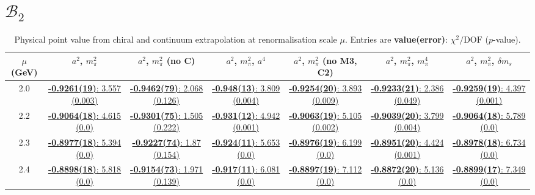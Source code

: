 \documentclass[12pt]{extarticle}
\begin{document}
\section{$\mathcal{B}_2$}
\begin{table}[h!]
\begin{center}
\begin{tabular}{|c|c|c|c|c|c|c|}
\hline
$\mu$ (GeV) & $a^2$, $m_\pi^2$& $a^2$, $m_\pi^2$ (no C)& $a^2$, $m_\pi^2$, $a^4$& $a^2$, $m_\pi^2$ (no M3, C2)& $a^2$, $m_\pi^2$, $m_\pi^4$& $a^2$, $m_\pi^2$, $\delta m_s$\\
\hline
2.0& \hyperlink{VVmAA/SUSY/bag_a2m2_20.pdf.1}{\textbf{-0.9261(19)}: 3.557 (0.003)} & \hyperlink{VVmAA/SUSY/bag_a2m2noC_20.pdf.1}{\textbf{-0.9462(79)}: 2.068 (0.126)} & \hyperlink{VVmAA/SUSY/bag_a2a4m2_20.pdf.1}{\textbf{-0.948(13)}: 3.809 (0.004)} & \hyperlink{VVmAA/SUSY/bag_a2m2mcut_20.pdf.1}{\textbf{-0.9254(20)}: 3.893 (0.009)} & \hyperlink{VVmAA/SUSY/bag_a2m2m4_20.pdf.1}{\textbf{-0.9233(21)}: 2.386 (0.049)} & \hyperlink{VVmAA/SUSY/bag_a2m2delm_20.pdf.1}{\textbf{-0.9259(19)}: 4.397 (0.001)}\\
2.2& \hyperlink{VVmAA/SUSY/bag_a2m2_22.pdf.1}{\textbf{-0.9064(18)}: 4.615 (0.0)} & \hyperlink{VVmAA/SUSY/bag_a2m2noC_22.pdf.1}{\textbf{-0.9301(75)}: 1.505 (0.222)} & \hyperlink{VVmAA/SUSY/bag_a2a4m2_22.pdf.1}{\textbf{-0.931(12)}: 4.942 (0.001)} & \hyperlink{VVmAA/SUSY/bag_a2m2mcut_22.pdf.1}{\textbf{-0.9063(19)}: 5.105 (0.002)} & \hyperlink{VVmAA/SUSY/bag_a2m2m4_22.pdf.1}{\textbf{-0.9039(20)}: 3.799 (0.004)} & \hyperlink{VVmAA/SUSY/bag_a2m2delm_22.pdf.1}{\textbf{-0.9064(18)}: 5.789 (0.0)}\\
2.3& \hyperlink{VVmAA/SUSY/bag_a2m2_23.pdf.1}{\textbf{-0.8977(18)}: 5.394 (0.0)} & \hyperlink{VVmAA/SUSY/bag_a2m2noC_23.pdf.1}{\textbf{-0.9227(74)}: 1.87 (0.154)} & \hyperlink{VVmAA/SUSY/bag_a2a4m2_23.pdf.1}{\textbf{-0.924(11)}: 5.653 (0.0)} & \hyperlink{VVmAA/SUSY/bag_a2m2mcut_23.pdf.1}{\textbf{-0.8976(19)}: 6.199 (0.0)} & \hyperlink{VVmAA/SUSY/bag_a2m2m4_23.pdf.1}{\textbf{-0.8951(20)}: 4.424 (0.001)} & \hyperlink{VVmAA/SUSY/bag_a2m2delm_23.pdf.1}{\textbf{-0.8978(18)}: 6.734 (0.0)}\\
2.4& \hyperlink{VVmAA/SUSY/bag_a2m2_24.pdf.1}{\textbf{-0.8898(18)}: 5.818 (0.0)} & \hyperlink{VVmAA/SUSY/bag_a2m2noC_24.pdf.1}{\textbf{-0.9154(73)}: 1.971 (0.139)} & \hyperlink{VVmAA/SUSY/bag_a2a4m2_24.pdf.1}{\textbf{-0.917(11)}: 6.081 (0.0)} & \hyperlink{VVmAA/SUSY/bag_a2m2mcut_24.pdf.1}{\textbf{-0.8897(19)}: 7.112 (0.0)} & \hyperlink{VVmAA/SUSY/bag_a2m2m4_24.pdf.1}{\textbf{-0.8872(20)}: 5.136 (0.0)} & \hyperlink{VVmAA/SUSY/bag_a2m2delm_24.pdf.1}{\textbf{-0.8899(17)}: 7.349 (0.0)}\\
\hline
\end{tabular}
\caption{Physical point value from chiral and continuum extrapolation at renormalisation scale $\mu$. Entries are \textbf{value(error)}: $\chi^2/\text{DOF}$ ($p$-value).}
\end{center}
\end{table}
\end{document}
